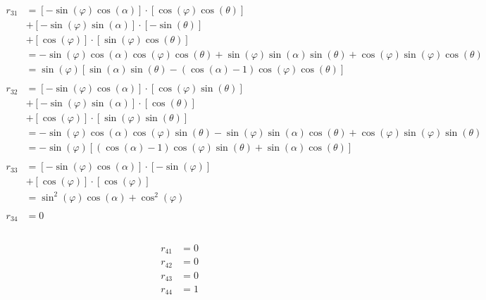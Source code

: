 \documentclass[a4paper]{article}
\theoremstyle{hangindent}
\theoremstyle{hangindent}
\begin{document}
\begin{align*}
    r_{31}
    &= \left[ -\sin(\varphi)\cos(\alpha) \right] \cdot \left[ \cos(\varphi)\cos(\theta) \right] \\
    &+ \left[ -\sin(\varphi)\sin(\alpha) \right] \cdot \left[ -\sin(\theta) \right] \\
    &+ \left[ \cos(\varphi) \right] \cdot \left[ \sin(\varphi)\cos(\theta) \right] \\
    &= -\sin(\varphi)\cos(\alpha)\cos(\varphi)\cos(\theta) + \sin(\varphi)\sin(\alpha)\sin(\theta) + \cos(\varphi)\sin(\varphi)\cos(\theta) \\
    &= \sin(\varphi)\left[ \sin(\alpha)\sin(\theta) - \left( \cos(\alpha)-1 \right) \cos(\varphi)\cos(\theta) \right] \\
    \\
    r_{32}
    &= \left[ -\sin(\varphi)\cos(\alpha) \right] \cdot \left[ \cos(\varphi)\sin(\theta) \right] \\
    &+ \left[ -\sin(\varphi)\sin(\alpha) \right] \cdot \left[ \cos(\theta) \right] \\
    &+ \left[ \cos(\varphi) \right] \cdot \left[ \sin(\varphi)\sin(\theta) \right] \\
    &= -\sin(\varphi)\cos(\alpha)\cos(\varphi)\sin(\theta) - \sin(\varphi)\sin(\alpha)\cos(\theta) + \cos(\varphi)\sin(\varphi)\sin(\theta) \\
    &= -\sin(\varphi)\left[ \left( \cos(\alpha)-1 \right) \cos(\varphi)\sin(\theta) + \sin(\alpha)\cos(\theta) \right] \\
    \\
    r_{33}
    &= \left[ -\sin(\varphi)\cos(\alpha) \right] \cdot \left[ -\sin(\varphi) \right] \\
    &+ \left[ \cos(\varphi) \right] \cdot \left[ \cos(\varphi) \right] \\
    &= \sin^2(\varphi)\cos(\alpha) + \cos^2(\varphi) \\
    \\
    r_{34} &= 0 \\
    \\
\end{align*}

\begin{align*}
    r_{41} &= 0 \\
    r_{42} &= 0 \\
    r_{43} &= 0 \\
    r_{44} &= 1 \\
\end{align*}
\end{document}
